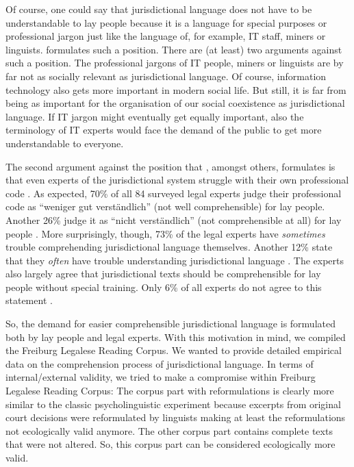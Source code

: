 \documentclass[output=paper]{langsci/langscibook}
\begin{document}
Of course, one could say that jurisdictional language does not have to be understandable to lay people because it is a language for special purposes or professional jargon just like the language of, for example, IT staff, miners or linguists. \citet{Towfigh2009} formulates such a position. There are (at least) two arguments against such a position. The professional jargons of IT people, miners or linguists are by far not as socially relevant as jurisdictional language. Of course, information technology also gets more important in modern social life. But still, it is far from being as important for the organisation of our social coexistence as jurisdictional language. If IT jargon might eventually get equally important, also the terminology of IT experts would face the demand of the public to get more understandable to everyone.

The second argument against the position that \citet{Towfigh2009}, amongst others, formulates is that even experts of the jurisdictional system struggle with their own professional code \citep[cf. ][]{eichhoff2009einstellungen}. As expected, 70\% of all 84 surveyed legal experts judge their professional code as “weniger gut verständlich” (not well comprehensible) for lay people. Another 26\% judge it as “nicht verständlich” (not comprehensible at all) for lay people \citep[p. 138]{eichhoff2009einstellungen}. More surprisingly, though, 73\% of the legal experts have \textit{sometimes} trouble comprehending jurisdictional language themselves. Another 12\% state that they \textit{often} have trouble understanding jurisdictional language \citep[p. 146]{eichhoff2009einstellungen}. The experts also largely agree that jurisdictional texts should be comprehensible for lay people without special training. Only 6\% of all experts do not agree to this statement \citep[p. 139]{eichhoff2009einstellungen}.

So, the demand for easier comprehensible jurisdictional language is formulated both by lay people and legal experts. With this motivation in mind, we compiled the Freiburg Legalese Reading Corpus. We wanted to provide detailed empirical data on the comprehension process of jurisdictional language. In terms of internal/external validity, we tried to make a compromise within Freiburg Legalese Reading Corpus: The corpus part with reformulations is clearly more similar to the classic psycholinguistic experiment because excerpts from original court decisions were reformulated by linguists making at least the reformulations not ecologically valid anymore. The other corpus part contains complete texts that were not altered. So, this corpus part can be considered ecologically more valid.
\end{document}
